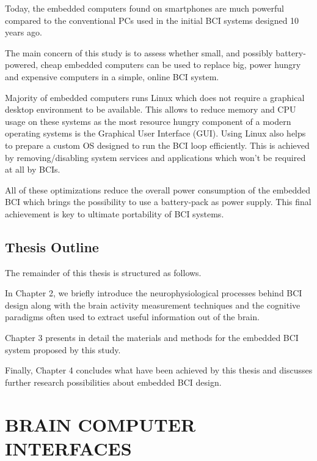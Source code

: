 \documentclass[12pt]{article}
\newcommand\mysection[1]{\vspace*{-0.35cm}\section{#1}\vspace*{6pt}\thispagestyle{empty}}
\newcommand\mysubsection[1]{\subsection{#1}}
\numberwithin{equation}{section}
\numberwithin{figure}{section}
\numberwithin{table}{section}
\begin{document}


    Today, the embedded computers found on smartphones are much powerful compared
    to the conventional PCs used in the initial BCI systems designed 10 years ago.
    
    \par{
    The main concern of this study is to assess whether small,
    and possibly battery-powered, cheap embedded computers can be used to replace big, power hungry and
    expensive computers in a simple, online BCI system.
}
\par{
    Majority of embedded computers runs Linux which does not require a graphical desktop environment
    to be available. This allows to reduce memory and CPU usage on these systems as the most resource
    hungry component of a modern operating systems is the Graphical User Interface (GUI).
    Using Linux also helps to prepare a custom OS designed to run the BCI loop efficiently.
    This is achieved by removing/disabling system services and applications which won't be required at all by BCIs.
}
\par{
    All of these optimizations reduce the overall power consumption of the embedded BCI which brings
    the possibility to use a battery-pack as power supply. This final achievement is key to ultimate
    portability of BCI systems.
}

\mysubsection{Thesis Outline}\label{seq:intro_outline}
\par
{
    The remainder of this thesis is structured as follows.
}
\par{
    In Chapter 2, we briefly introduce the neurophysiological processes
    behind BCI design along with the brain activity measurement techniques and the cognitive paradigms
    often used to extract useful information out of the brain.
}
\par{
    Chapter 3 presents in detail the materials and methods for the embedded BCI
    system proposed by this study.
}
\par{
    Finally, Chapter 4 concludes what have been achieved by this thesis and
    discusses further research possibilities about embedded BCI design.
}

\clearpage

\mysection{BRAIN COMPUTER INTERFACES}\label{seq:bci}
\end{document}
